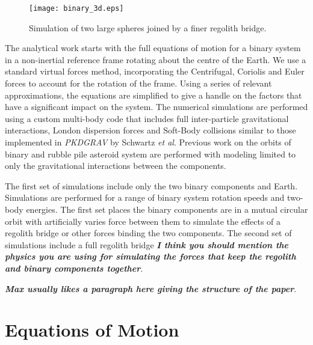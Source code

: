 \documentclass[letterpaper, preprint, paper,11pt]{AAS}	%
\begin{document}
\begin{figure}[H]
\centering
\texttt{[image: binary\_3d.eps]} 
\caption{Simulation of two large spheres joined by a finer regolith bridge.} 
\label{fig:Pic}
\end{figure} 

The analytical work starts with the full equations of motion for a binary system in a non-inertial reference frame rotating about the centre of the Earth. We use a standard virtual forces method, incorporating the Centrifugal, Coriolis and Euler forces to account for the rotation of the frame. Using a series of relevant approximations, the equations are simplified to give a handle on the factors that have a significant impact on the system. The numerical simulations are performed using a custom multi-body code that includes full inter-particle gravitational interactions, London dispersion forces and Soft-Body collisions similar to those implemented in \textit{PKDGRAV} by Schwartz \textit{et al}\cite{soft}. Previous work on the orbits of binary and rubble pile asteroid system are performed with modeling limited to only the gravitational interactions between the components. 

The first set of simulations include only the two binary components and Earth. Simulations are performed for a range of binary system rotation speeds and two-body energies. The first set places the binary components are in a mutual circular orbit with artificially varies force between them to simulate the effects of a regolith bridge or other forces binding the two components. The second set of simulations include a full regolith bridge \textbf{\emph{I think you should mention the physics you are using for simulating the forces that keep the regolith and binary components together}}.

\textbf{\emph{Max usually likes a paragraph here giving the structure of the paper}}.

\section{Equations of Motion}
\end{document}

